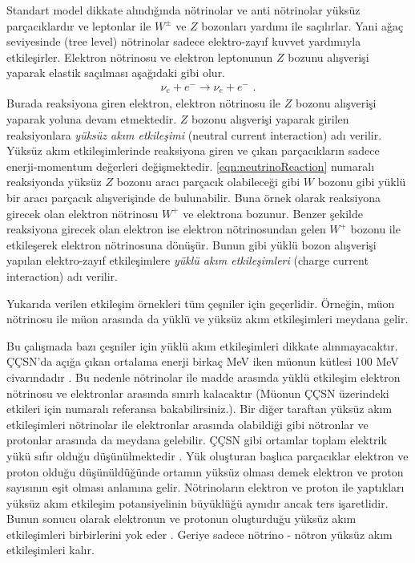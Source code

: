 Standart model dikkate alındığında nötrinolar ve anti nötrinolar yüksüz parçacıklardır ve leptonlar ile $ W^{\pm} $ ve $ Z $ bozonları yardımı ile saçılırlar. Yani ağaç seviyesinde (tree level) nötrinolar sadece elektro-zayıf kuvvet yardımıyla etkileşirler. Elektron nötrinosu ve elektron leptonunun $ Z $ bozunu alışverişi yaparak elastik saçılması aşağıdaki gibi olur.
\begin{align}\label{eqn:neutrinoReaction}
	\nu_{e} + e^{-} \rightarrow \nu_{e} + e^{-} \text{ .}
\end{align}
Burada reaksiyona giren elektron, elektron nötrinosu ile $ Z $ bozonu alışverişi yaparak yoluna devam etmektedir. $ Z $ bozonu alışverişi yaparak girilen reaksiyonlara \emph{yüksüz akım etkileşimi} (neutral current interaction) adı verilir. Yüksüz akım etkileşimlerinde reaksiyona giren ve çıkan parçacıkların sadece enerji-momentum değerleri değişmektedir. \eqref{eqn:neutrinoReaction} numaralı reaksiyonda yüksüz $ Z $ bozonu aracı parçacık olabileceği gibi $ W $ bozonu gibi yüklü bir aracı parçacık alışverişinde de bulunabilir. Buna örnek olarak reaksiyona girecek olan elektron nötrinosu $ W^{+} $ ve elektrona bozunur. Benzer şekilde reaksiyona girecek olan elektron ise elektron nötrinosundan gelen $ W^{+} $ bozonu ile etkileşerek elektron nötrinosuna dönüşür. Bunun gibi yüklü bozon alışverişi yapılan elektro-zayıf etkileşimlere \emph{yüklü akım etkileşimleri} (charge current interaction) adı verilir. 

Yukarıda verilen etkileşim örnekleri tüm çeşniler için geçerlidir. Örneğin, müon nötrinosu ile müon arasında da yüklü ve yüksüz akım etkileşimleri meydana gelir. 

Bu çalışmada bazı çeşniler için yüklü akım etkileşimleri dikkate alınmayacaktır. ÇÇSN'da açığa çıkan ortalama enerji birkaç MeV iken müonun kütlesi $ 100 $ MeV civarındadır \cite{ParticleDataGroup:2018ovx, Janka:2006fh}. Bu nedenle nötrinolar ile madde arasında yüklü etkileşim elektron nötrinosu ve elektronlar arasında sınırlı kalacaktır (Müonun ÇÇSN üzerindeki etkileri için \cite{Fischer:2020vie} numaralı referansa bakabilirsiniz.). Bir diğer taraftan yüksüz akım etkileşimleri nötrinolar ile elektronlar arasında olabildiği gibi nötronlar ve protonlar arasında da meydana gelebilir. ÇÇSN gibi ortamlar toplam elektrik yükü sıfır olduğu düşünülmektedir \cite{Janka:2006fh}. Yük oluşturan başlıca parçacıklar elektron ve proton olduğu düşünüldüğünde ortamın yüksüz olması demek elektron ve proton sayısının eşit olması anlamına gelir. Nötrinoların elektron ve proton ile yaptıkları yüksüz akım etkileşim potansiyelinin büyüklüğü aynıdır ancak ters işaretlidir. Bunun sonucu olarak elektronun ve protonun oluşturduğu yüksüz akım etkileşimleri birbirlerini yok eder \cite{Giunti:2007ry}. Geriye sadece nötrino - nötron yüksüz akım etkileşimleri kalır.

